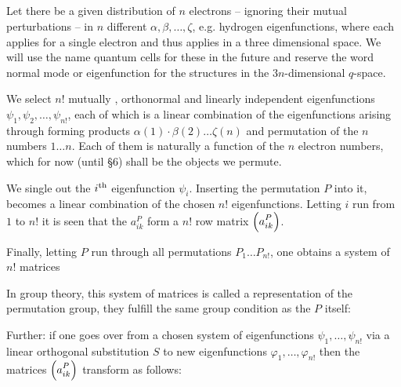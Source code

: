 \begin{paper}{1}
\subsection{}
Let there be a given distribution of $n$ electrons -- ignoring their mutual perturbations -- in $n$ different  $\alpha,\beta,\dots,\zeta$, e.g. hydrogen eigenfunctions, where each applies for a single electron and thus applies in a three dimensional space. We will use the name quantum cells for these in the future and reserve the word normal mode or eigenfunction for the structures in the $3n$-dimensional $q$-space.

We select $n!$ mutually , orthonormal and linearly independent eigenfunctions $\psi_1,\psi_2,\dots,\psi_{n!}$, each of which is a linear combination of the eigenfunctions arising through forming products $\alpha(1)\cdot\beta(2)\dots\zeta(n)$ and permutation of the $n$ numbers $1\dots n$. Each of them is naturally a function of the $n$ electron numbers, which for now (until \S 6) shall be the objects we permute.

We single out the ${i}^\text{th}$ eigenfunction $\psi_i$. Inserting the permutation $P$ into it,
becomes a linear combination of the chosen $n!$ eigenfunctions. Letting $i$ run from $1$ to $n!$ it is seen that the $a_{ik}^P$ form a $n!$ row matrix $\Aikp{a}{ik}{P}$.

Finally, letting $P$ run through all permutations $P_1\dots P_{n!}$, one obtains a system of $n!$ matrices

In group theory, this system of matrices is called a representation of the permutation group, they fulfill the same group condition as the $P$ itself:

Further: if one goes over from a chosen system of eigenfunctions $\psi_1,\dots,\psi_{n!}$ via a linear orthogonal substitution $S$ to new eigenfunctions $\varphi_1,\dots,\varphi_{n!}$
then the matrices $\Aikp{a}{ik}{P}$ transform as follows:


\end{paper}
